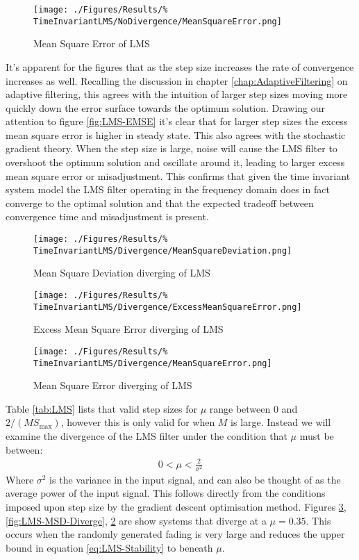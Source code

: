 \begin{figure}[ht]
	\centering
	\texttt{[image: ./Figures/Results/\%
	TimeInvariantLMS/NoDivergence/MeanSquareError.png]}
	\caption{Mean Square Error of LMS}
	\label{fig:LMS-MSE}
\end{figure}
It's apparent for the figures that as the step size increases the %
rate of convergence increases as well. Recalling the discussion in %
chapter \ref{chap:AdaptiveFiltering} on adaptive filtering, this %
agrees with the intuition of larger step sizes moving more quickly %
down the error surface towards the optimum solution. %
Drawing our attention to figure \ref{fig:LMS-EMSE} it's clear that %
for larger step sizes the excess mean square error is higher %
in steady state. This also agrees with the stochastic gradient %
theory. When the step size is large, noise will cause %
the LMS filter to overshoot the optimum solution and oscillate %
around it, leading to larger excess mean square error or %
misadjustment. This confirms that given the time invariant system %
model the LMS filter operating in the frequency domain does %
in fact converge to the optimal solution and that %
the expected tradeoff between convergence time and misadjustment is %
present.
\begin{figure}[ht]
	\centering
	\begin{minipage}{0.49\textwidth}
		\texttt{[image: ./Figures/Results/\%
		TimeInvariantLMS/Divergence/MeanSquareDeviation.png]}
		\caption{Mean Square Deviation diverging of LMS}
		\label{fig:LMS-MSD-Diverge}
	\end{minipage}
	\begin{minipage}{0.49\textwidth}
		\texttt{[image: ./Figures/Results/\%
		TimeInvariantLMS/Divergence/ExcessMeanSquareError.png]}
		\caption{Excess Mean Square Error diverging of LMS}
		\label{fig:LMS-EMSE-Diverge}
	\end{minipage}
\end{figure}
\begin{figure}[ht]
	\centering
	\texttt{[image: ./Figures/Results/\%
	TimeInvariantLMS/Divergence/MeanSquareError.png]}
	\caption{Mean Square Error diverging of LMS}
	\label{fig:LMS-MSE-Diverge}
\end{figure}
Table \ref{tab:LMS} lists that valid step sizes for $\mu$ range %
between $0$ and $2/(M S_{\text{max}})$, however %
this is only valid for when $M$ is large. Instead we will %
examine the divergence of the LMS filter under the %
condition that $\mu$ must be between:
\begin{align}
	0 < \mu < \frac{2}{\sigma^{2}}
	\label{eq:LMS-Stability}
\end{align}
Where $\sigma^{2}$ is the variance in the input signal, and can also %
be thought of as the average power of the input signal. This follows %
directly from the conditions imposed upon step size by the gradient %
descent optimisation method. Figures \ref{fig:LMS-MSE-Diverge}, %
\ref{fig:LMS-MSD-Diverge}, \ref{fig:LMS-EMSE-Diverge} are %
show systems that diverge at a $\mu = 0.35$. This occurs %
when the randomly generated fading is very large and reduces %
the upper bound in equation \ref{eq:LMS-Stability} to beneath %
$\mu$.
\FloatBarrier
